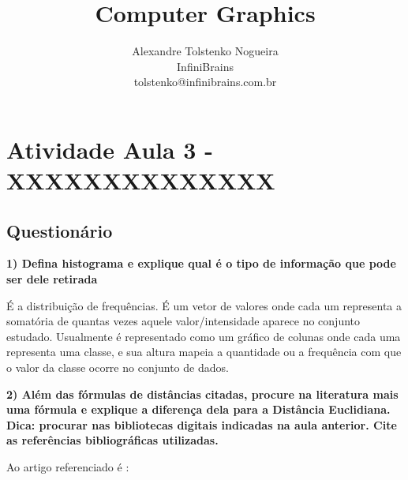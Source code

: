 \documentclass[a4paper]{sbgames}               %
\title{Computer Graphics}
\author{Alexandre Tolstenko Nogueira\\InfiniBrains\\tolstenko@infinibrains.com.br 
}
\begin{document}


\maketitle




\section{Atividade Aula 3 - XXXXXXXXXXXXXX}

\subsection*{Questionário}

\textbf{1) Defina histograma e explique qual é o tipo de informação que pode ser dele retirada}

É a distribuição de frequências. É um vetor de valores onde cada um representa a somatória de quantas vezes aquele valor/intensidade aparece no conjunto estudado. Usualmente é representado como um gráfico de colunas onde cada uma representa uma classe, e sua altura mapeia a quantidade ou a frequência com que o valor da classe ocorre no conjunto de dados.

\textbf{2) Além das fórmulas de distâncias citadas, procure na literatura mais uma fórmula e explique a diferença dela para a Distância Euclidiana. Dica: procurar nas bibliotecas digitais indicadas na aula anterior. Cite as referências bibliográficas
utilizadas.
}

Ao artigo referenciado é \cite{chouikhi2017improved}:
\end{document}
